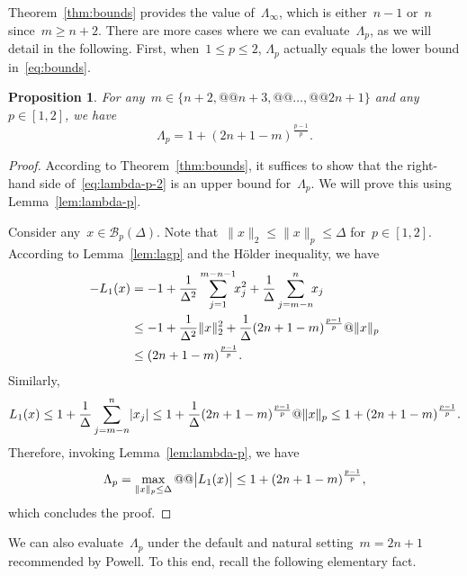 \documentclass{article}
\numberwithin{equation}{section}
\theoremstyle{definition}
\theoremstyle{plain}
\newtheorem{proposition}{Proposition}[section]
\theoremstyle{remark}
\newcommand*{\abs}[2][]{#1\lvert#2#1\rvert}
\newcommand*{\norm}[2][]{#1\lVert#2#1\rVert}
\newcommand*{\set}[2][]{#1\{#2#1\}}
\newcommand*{\lagp}[1][]{L\ifblank{#1}{}{_{#1}}}
\begin{document}
Theorem~\ref{thm:bounds} provides the value of~$\Lambda_{\infty}$, which is either~$n - 1$ or~$n$ since~$m \ge n + 2$.
There are more cases where we can evaluate~$\Lambda_p$, as we will detail in the following.
First, when~$1 \le p \le 2$, $\Lambda_p$ actually equals the lower bound in~\eqref{eq:bounds}.

\begin{proposition}
    \label{prop:lambda-p-2}
    For any~$m \in \set{n + 2, @@ n + 3, @@ \dots, @@ 2n + 1}$ and any~$p \in[1, 2]$, we have
    \begin{equation}
        \label{eq:lambda-p-2}
        \Lambda_p = 1 + (2n + 1 - m)^{\frac{p - 1}{p}}.
    \end{equation}
\end{proposition}

\begin{proof}
    According to Theorem~\ref{thm:bounds}, it suffices to show that the right-hand side of~\eqref{eq:lambda-p-2} is an upper bound for~$\Lambda_p$.
    We will prove this using Lemma~\ref{lem:lambda-p}.

    Consider any~$x \in \mathcal{B}_p(\Delta)$.
    Note that~$\norm{x}_2 \le\norm{x}_p \le \Delta $ for~$p\in[1, 2]$.
    According to Lemma~\ref{lem:lagp} and the H{\"{o}}lder inequality, we have
    \begin{align*}
        -\lagp[1](x)    &= -1 + \frac{1}{\Delta^2} \sum_{j = 1}^{m - n - 1} \!\! x_j^2 + \frac{1}{\Delta} \sum_{j = m - n}^n \!\! x_j\\
                        &\le -1 + \frac{1}{\Delta^2}\norm{x}_2^2 + \frac{1}{\Delta} (2n+1-m)^{\frac{p-1}{p}} @ \norm{x}_p\\
                        &\le (2n+1-m)^{\frac{p-1}{p}}.
    \end{align*}
    Similarly,
    \begin{equation*}
        \lagp[1](x) \le 1 + \frac{1}{\Delta}\sum_{j = m - n}^n \abs{x_j} \le 1 + \frac{1}{\Delta} (2n + 1 - m)^{\frac{p-1}{p}} @ \norm{x}_p \le 1 + (2n + 1 - m)^{\frac{p - 1}{p}}.
    \end{equation*}
    Therefore, invoking Lemma~\ref{lem:lambda-p}, we have
    \begin{equation*}
        \Lambda_p = \max_{\norm{x}_p \le \Delta} @@ \abs[\big]{\lagp[1](x)} \le 1 + (2n + 1 - m)^{\frac{p - 1}{p}},
    \end{equation*}
    which concludes the proof.
\end{proof}

We can also evaluate~$\Lambda_p$ under the default and natural setting~$m = 2n + 1$ recommended by Powell.
To this end, recall the following elementary fact.
\end{document}
